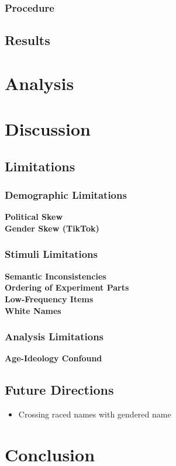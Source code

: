 \documentclass{article}
\begin{document}
	\subsubsection{Procedure}
	
	\subsection{Results}
	
	\newpage
	\section{Analysis}
	
	\newpage
	\section{Discussion}
	
	\subsection{Limitations}
	
	\subsubsection{Demographic Limitations}
	\textbf{Political Skew} \\
	\linebreak
	\textbf{Gender Skew (TikTok)}
	
	\subsubsection{Stimuli Limitations}
	\textbf{Semantic Inconsistencies} \\
	\linebreak
	\textbf{Ordering of Experiment Parts}\\
	\linebreak
	\textbf{Low-Frequency Items}\\
	\linebreak
	\textbf{White Names}
	
	\subsubsection{Analysis Limitations}
	\textbf{Age-Ideology Confound}
	
	\subsection{Future Directions}
	
	\begin{itemize}
		\item Crossing raced names with gendered name
	\end{itemize}
	
	\newpage
	\section{Conclusion}
	
	\newpage
	
	\printbibliography
	
\end{document}
